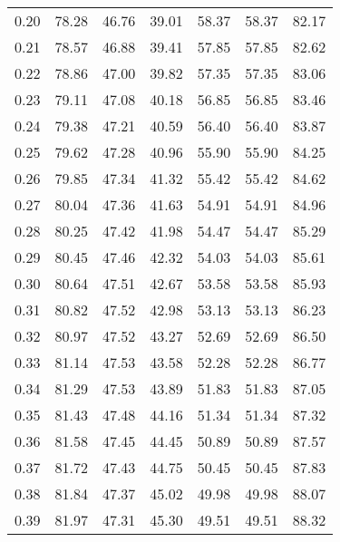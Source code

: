 \begin{tabular}{|c|c|c|c|c|c|c|}
      0.20 &     78.28 &     46.76 &      39.01 &   58.37 &      58.37 &         82.17 \\
      0.21 &     78.57 &     46.88 &      39.41 &   57.85 &      57.85 &         82.62 \\
      0.22 &     78.86 &     47.00 &      39.82 &   57.35 &      57.35 &         83.06 \\
      0.23 &     79.11 &     47.08 &      40.18 &   56.85 &      56.85 &         83.46 \\
      0.24 &     79.38 &     47.21 &      40.59 &   56.40 &      56.40 &         83.87 \\
      0.25 &     79.62 &     47.28 &      40.96 &   55.90 &      55.90 &         84.25 \\
      0.26 &     79.85 &     47.34 &      41.32 &   55.42 &      55.42 &         84.62 \\
      0.27 &     80.04 &     47.36 &      41.63 &   54.91 &      54.91 &         84.96 \\
      0.28 &     80.25 &     47.42 &      41.98 &   54.47 &      54.47 &         85.29 \\
      0.29 &     80.45 &     47.46 &      42.32 &   54.03 &      54.03 &         85.61 \\
      0.30 &     80.64 &     47.51 &      42.67 &   53.58 &      53.58 &         85.93 \\
      0.31 &     80.82 &     47.52 &      42.98 &   53.13 &      53.13 &         86.23 \\
      0.32 &     80.97 &     47.52 &      43.27 &   52.69 &      52.69 &         86.50 \\
      0.33 &     81.14 &     47.53 &      43.58 &   52.28 &      52.28 &         86.77 \\
      0.34 &     81.29 &     47.53 &      43.89 &   51.83 &      51.83 &         87.05 \\
      0.35 &     81.43 &     47.48 &      44.16 &   51.34 &      51.34 &         87.32 \\
      0.36 &     81.58 &     47.45 &      44.45 &   50.89 &      50.89 &         87.57 \\
      0.37 &     81.72 &     47.43 &      44.75 &   50.45 &      50.45 &         87.83 \\
      0.38 &     81.84 &     47.37 &      45.02 &   49.98 &      49.98 &         88.07 \\
      0.39 &     81.97 &     47.31 &      45.30 &   49.51 &      49.51 &         88.32 \\

\end{tabular}
